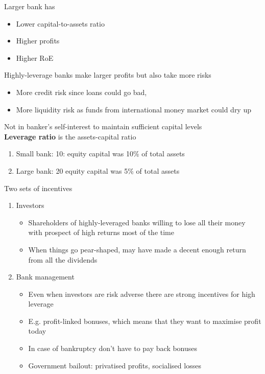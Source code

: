 \documentclass{beamer}
\begin{document}
\begin{frame}
  Larger bank has 
  \begin{itemize}
    \item Lower capital-to-assets ratio
    \item Higher profits
    \item Higher RoE
  \end{itemize}
  \medskip
  Highly-leverage banks make larger profits but also take more risks
  \begin{itemize}
    \item More credit risk since loans could go bad, 
    \item More liquidity risk as funds from international money market could dry up
  \end{itemize}
  \medskip
  Not in banker's self-interest to maintain sufficient capital levels\\
  \medskip
  \textbf{Leverage ratio} is the assets-capital ratio
\begin{enumerate}
  \item Small bank: 10: equity capital was 10\% of total assets 
  \item Large bank: 20  equity capital was 5\% of total assets 
\end{enumerate}
\end{frame}

\begin{frame}
 Two sets of incentives  
\begin{enumerate}
  \item Investors
  \begin{itemize}
    \item Shareholders of highly-leveraged banks willing to lose all their money with prospect of high returns most of the time
    \item When things go pear-shaped, may have made a decent enough return from all the dividends
  \end{itemize}
  \item Bank management
  \begin{itemize}
    \item Even when investors are risk adverse there are strong incentives for high leverage
    \item E.g. profit-linked bonuses, which means that they want to maximise profit today
    \item In case of bankruptcy don't have to pay back bonuses
    \item Government bailout: privatised profits, socialised losses 
  \end{itemize}
\end{enumerate}
\end{frame}
\end{document}
